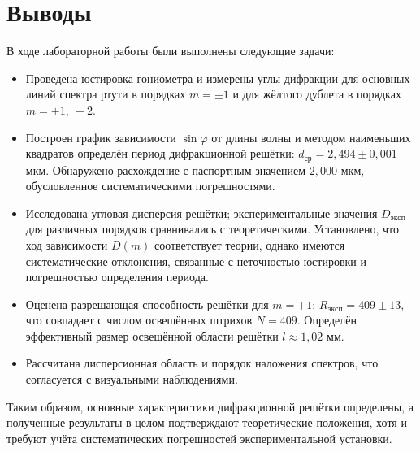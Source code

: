 \documentclass[a4paper]{article}
\begin{document}
\section{Выводы}

В ходе лабораторной работы были выполнены следующие задачи:
\begin{itemize}
    \item Проведена юстировка гониометра и измерены углы дифракции для основных линий спектра ртути в порядках $m = \pm1$ и для жёлтого дублета в порядках $m = \pm1,\ \pm2$.
    \item Построен график зависимости $\sin\varphi$ от длины волны и методом наименьших квадратов определён период дифракционной решётки: $d_\text{ср} = 2{,}494 \pm 0{,}001$ мкм. Обнаружено расхождение с паспортным значением $2{,}000$ мкм, обусловленное систематическими погрешностями.
    \item Исследована угловая дисперсия решётки; экспериментальные значения $D_\text{эксп}$ для различных порядков сравнивались с теоретическими. Установлено, что ход зависимости $D(m)$ соответствует теории, однако имеются систематические отклонения, связанные с неточностью юстировки и погрешностью определения периода.
    \item Оценена разрешающая способность решётки для $m=+1$: $R_\text{эксп} = 409 \pm 13$, что совпадает с числом освещённых штрихов $N=409$. Определён эффективный размер освещённой области решётки $l \approx 1{,}02$ мм.
    \item Рассчитана дисперсионная область и порядок наложения спектров, что согласуется с визуальными наблюдениями.
\end{itemize}
Таким образом, основные характеристики дифракционной решётки определены, а полученные результаты в целом подтверждают теоретические положения, хотя и требуют учёта систематических погрешностей экспериментальной установки.
\end{document}
